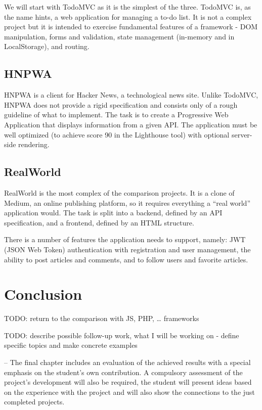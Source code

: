 \documentclass[english,odsaz]{fitthesis}
\begin{document}
We will start with TodoMVC as it is the simplest of the three. TodoMVC is, as
the name hints, a web application for managing a to-do list. It is not a complex
project but it is intended to exercise fundamental features of a framework - DOM
manipulation, forms and validation, state management (in-memory and in
LocalStorage), and routing.

\section{HNPWA}
\label{sec:org3efaa9d}
HNPWA \cite{hnpwa} is a client for Hacker News, a technological news site. Unlike TodoMVC,
HNPWA does not provide a rigid specification and consists only of a rough
guideline of what to implement. The task is to create a Progressive Web
Application that displays information from a given API. The application must be
well optimized (to achieve score 90 in the Lighthouse tool) with optional
server-side rendering.

\section{RealWorld}
\label{sec:org1a9c50c}
RealWorld \cite{realworld} is the most complex of the comparison projects. It is a clone of
Medium, an online publishing platform, so it requires everything a ``real world''
application would. The task is split into a backend, defined by an API
specification, and a frontend, defined by an HTML structure.

There is a number of features the application needs to support, namely: JWT
(JSON Web Token) authentication with registration and user management, the
ability to post articles and comments, and to follow users and favorite articles.

\chapter{Conclusion}
\label{sec:orgd0c3ea8}
TODO: return to the comparison with JS, PHP, \ldots{} frameworks

TODO: describe possible follow-up work, what I will be working on - define
specific topics and make concrete examples

-- The final chapter includes an evaluation of the achieved results with a special
emphasis on the student's own contribution. A compulsory assessment of the
project's development will also be required, the student will present ideas
based on the experience with the project and will also show the connections to
the just completed projects. \cite{Pravidla}
\end{document}
